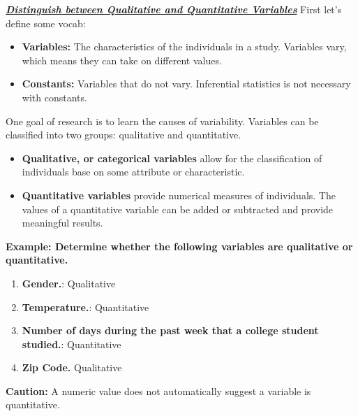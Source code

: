 \documentclass{report}
\begin{document}
        \bigbreak \noindent \bigbreak \noindent 
        \textbf{\textit{\underline{Distinguish between Qualitative and Quantitative Variables}}}
        \bigbreak \noindent 
        First let's define some vocab:
        \begin{itemize}
            \item \textbf{Variables:} The characteristics of the individuals in a study. Variables vary, which means they can take on different values.
            \item \textbf{Constants:} Variables that do not vary. Inferential statistics is not necessary with constants.
        \end{itemize}
        \bigbreak \noindent 
        One goal of research is to learn the causes of variability.
        \bigbreak \noindent 
        Variables can be classified into two groups: qualitative and quantitative.
        \begin{itemize}
            \item \textbf{Qualitative, or categorical variables} allow for the classification of individuals base on some attribute or characteristic.
            \item \textbf{Quantitative variables} provide numerical measures of individuals. The values of a quantitative variable can be added or subtracted and provide meaningful results.
        \end{itemize}
        \bigbreak \noindent 
        \begin{mdframed}
          \textbf{Example: Determine whether the following variables are qualitative or quantitative.}
          \begin{enumerate}[label=\alph*.)]
              \item \textbf{Gender.}: Qualitative
              \item \textbf{Temperature.}: Quantitative
              \item \textbf{Number of days during the past week that a college student studied.}: Quantitative
              \item \textbf{Zip Code.} Qualitative
          \end{enumerate}
          \textbf{Caution:} A numeric value does not automatically suggest a variable is quantitative.
        \end{mdframed}
\end{document}
